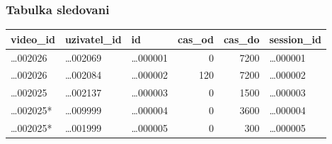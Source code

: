 \documentclass[12pt,a4paper]{article}
\begin{document}
\subsubsection{Tabulka sledovani}

{\small
\begin{tabularx}{\textwidth}{|l|l|l|r|r|X|}
\hline
\textbf{video\_id} & \textbf{uzivatel\_id} & \textbf{id} & \textbf{cas\_od} & \textbf{cas\_do} & \textbf{session\_id} \\
\hline
…002026  & …002069 & …000001 &   0 & 7200 & …000001 \\
\hline
…002026  & …002084 & …000002 & 120 & 7200 & …000002 \\
\hline
…002025  & …002137 & …000003 &   0 & 1500 & …000003 \\
\hline
…002025* & …009999 & …000004 &   0 & 3600 & …000004 \\
\hline
…002025* & …001999 & …000005 &   0 &  300 & …000005 \\
\hline
\end{tabularx}
}
\end{document}
